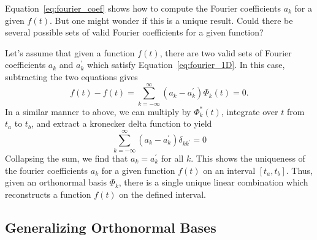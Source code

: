 Equation~\ref{eq:fourier_coef} shows how to compute the Fourier coefficients
$a_k$ for a given $f(t)$.  But one might wonder if this is a unique result.
Could there be several possible sets of valid Fourier coefficients for
a given function?

Let's assume that given a function $f(t)$, there are two valid sets of
Fourier coefficients $a_k$ and $a^\prime_k$ which satisfy
Equation~\ref{eq:fourier_1D}.  In this case, subtracting the two equations
gives
\begin{equation}
  f(t) - f(t) = \sum_{k=-\infty}^\infty (a_k - a^\prime_k)\Phi_k(t) = 0.
\end{equation}
In a similar manner to above, we can multiply by $\Phi^\ast_k(t)$, integrate
over $t$ from $t_a$ to $t_b$, and extract a kronecker delta function to
yield
\begin{equation}
  \sum_{k=-\infty}^\infty (a_k - a^\prime_k) \delta_{kk^\prime} = 0
\end{equation}
Collapsing the sum, we find that $a_k = a^\prime_k$ for all $k$.  This
shows the uniqueness of the fourier coefficients $a_k$ for a given function
$f(t)$ on an interval $[t_a, t_b]$.  Thus, given an orthonormal basis $\Phi_k$,
there is a single unique linear combination which reconstructs a function
$f(t)$ on the defined interval.

\subsection{Generalizing Orthonormal Bases}

